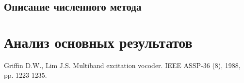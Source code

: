 \documentclass[a4paper,article,14pt]{extarticle}
\begin{document}
\subsection{ Описание численного метода  }


\pagebreak
\section{ Анализ основных результатов }




\pagebreak



\begin{thebibliography}{1}
 Griffin D.W., Lim J.S. \flqq Multiband excitation vocoder\frqq. IEEE ASSP-36 (8), 1988, pp. 1223-1235.
\end{thebibliography}
\end{document}
